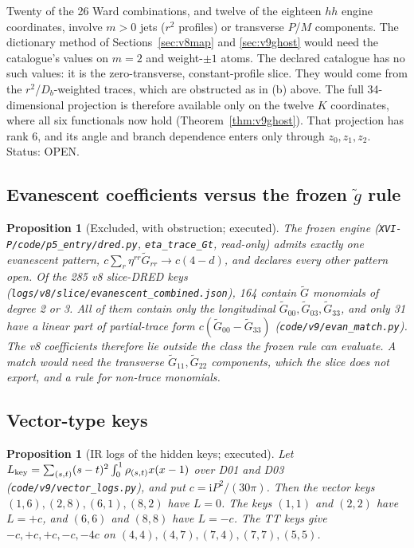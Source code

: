 \documentclass[11pt,a4paper]{article}
\newcommand{\ii}{\mathrm i}
\newcommand{\loc}[1]{\nolinkurl{#1}}
\newcommand{\OPEN}{\textsf{OPEN}}
\theoremstyle{plain}
\newtheorem{proposition}[theorem]{Proposition}
\theoremstyle{definition}
\theoremstyle{remark}
\numberwithin{equation}{section}
\begin{document}
Twenty of the 26 Ward combinations, and twelve of the eighteen
\(hh\) engine coordinates, involve \(m>0\) jets (\(r^2\) profiles)
or transverse \(P\)/\(M\) components. The dictionary method of
Sections~\ref{sec:v8map} and \ref{sec:v9ghost} would need the
catalogue's values on \(m=2\) and weight-\(\pm1\) atoms. The
declared catalogue has no such values: it is the zero-transverse,
constant-profile slice. They would come from the
\(r^2\)/\(D_b\)-weighted traces, which are obstructed as in (b)
above. The full 34-dimensional projection is therefore available
only on the twelve \(K\) coordinates, where all six functionals now
hold (Theorem~\ref{thm:v9ghost}). That projection has rank 6, and
its angle and branch dependence enters only through \(z_0,z_1,z_2\).
Status: \OPEN.

\subsection{Evanescent coefficients versus the frozen \texorpdfstring{\(\tilde g\)}{g-tilde} rule}

\begin{proposition}[Excluded, with obstruction; executed]
\label{prop:v9evan}
The frozen engine (\loc{XVI-P/code/p5_entry/dred.py},
\loc{eta_trace_Gt}, read-only) admits exactly one evanescent
pattern, \(c\sum_r\eta^{rr}\tilde G_{rr}\to c(4-d)\), and declares
every other pattern open. Of the 285 v8 slice-DRED keys
(\loc{logs/v8/slice/evanescent_combined.json}), 164 contain
\(\tilde G\) monomials of degree 2 or 3. All of them contain only
the longitudinal \(\tilde G_{00},\tilde G_{03},\tilde G_{33}\), and
only 31 have a linear part of partial-trace form
\(c(\tilde G_{00}-\tilde G_{33})\)
(\loc{code/v9/evan_match.py}). The v8 coefficients therefore lie
outside the class the frozen rule can evaluate. A match would need
the transverse \(\tilde G_{11},\tilde G_{22}\) components, which
the slice does not export, and a rule for non-trace monomials.
\end{proposition}

\subsection{Vector-type keys}

\begin{proposition}[IR logs of the hidden keys; executed]
\label{prop:v9vector}
Let \(L_{\rm key}=\sum_{(s,t)}(s-t)^2\int_0^1\rho_{(s,t)}x(x-1)\)
over D01 and D03 (\loc{code/v9/vector_logs.py}), and put
\(c=\ii P^2/(30\pi)\). Then the vector keys \((1,6),(2,8),(6,1),(8,2)\)
have \(L=0\). The keys \((1,1)\) and \((2,2)\) have \(L=+c\), and
\((6,6)\) and \((8,8)\) have \(L=-c\). The TT keys give
\(-c,+c,+c,-c,-4c\) on \((4,4),(4,7),(7,4),(7,7),(5,5)\).
\end{proposition}
\end{document}
